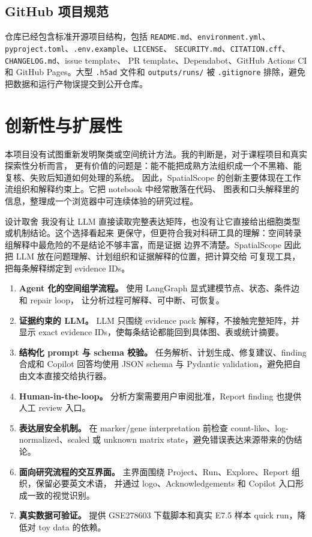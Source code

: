 \documentclass[11pt,a4paper]{article}
\newcommand{\breakcode}[1]{\begingroup\ttfamily\small\nolinkurl{#1}\endgroup}
\begin{document}
\subsection{GitHub 项目规范}

仓库已经包含标准开源项目结构，包括 \breakcode{README.md}、\breakcode{environment.yml}、
\breakcode{pyproject.toml}、\breakcode{.env.example}、\breakcode{LICENSE}、
\breakcode{SECURITY.md}、\breakcode{CITATION.cff}、\breakcode{CHANGELOG.md}、issue template、
PR template、Dependabot、GitHub Actions CI 和 GitHub Pages。大型 \breakcode{.h5ad} 文件和
\breakcode{outputs/runs/} 被 \breakcode{.gitignore} 排除，避免把数据和运行产物误提交到公开仓库。

\section{创新性与扩展性}

本项目没有试图重新发明聚类或空间统计方法。我的判断是，对于课程项目和真实探索性分析而言，
更有价值的问题是：能不能把成熟方法组织成一个不黑箱、能复核、失败后知道如何处理的系统。
因此，SpatialScope 的创新主要体现在工作流组织和解释约束上。它把 notebook 中经常散落在代码、
图表和口头解释里的信息，整理成一个浏览器中可连续体验的研究过程。

\begin{summarybox}{设计取舍}
  我没有让 LLM 直接读取完整表达矩阵，也没有让它直接给出细胞类型或机制结论。这个选择看起来
  更保守，但更符合我对科研工具的理解：空间转录组解释中最危险的不是结论不够丰富，而是证据
  边界不清楚。SpatialScope 因此把 LLM 放在问题理解、计划组织和证据解释的位置，把计算交给
  可复现工具，把每条解释绑定到 evidence IDs。
\end{summarybox}

\begin{enumerate}
  \item \textbf{Agent 化的空间组学流程。} 使用 LangGraph 显式建模节点、状态、条件边和 repair loop，
  让分析过程可解释、可中断、可恢复。
  \item \textbf{证据约束的 LLM。} LLM 只围绕 evidence pack 解释，不接触完整矩阵，并显示 exact
  evidence IDs，使每条结论都能回到具体图、表或统计摘要。
  \item \textbf{结构化 prompt 与 schema 校验。} 任务解析、计划生成、修复建议、finding 合成和
  Copilot 回答均使用 JSON schema 与 Pydantic validation，避免把自由文本直接交给执行器。
  \item \textbf{Human-in-the-loop。} 分析方案需要用户审阅批准，Report finding 也提供人工 review 入口。
  \item \textbf{表达层安全机制。} 在 marker/gene interpretation 前检查 count-like、log-normalized、scaled
  或 unknown matrix state，避免错误表达来源带来的伪结论。
  \item \textbf{面向研究流程的交互界面。} 主界面围绕 Project、Run、Explore、Report 组织，保留必要英文术语，
  并通过 logo、Acknowledgements 和 Copilot 入口形成一致的视觉识别。
  \item \textbf{真实数据可验证。} 提供 GSE278603 下载脚本和真实 E7.5 样本 quick run，降低对 toy data 的依赖。
\end{enumerate}
\end{document}
